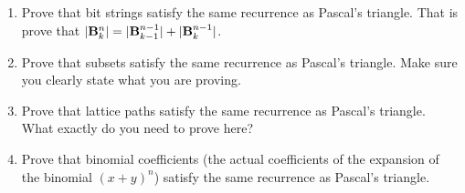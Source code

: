 \documentclass{book}
\begin{document}
\setcounter{project}{71}
\addtocounter{project}{-1}
\begin{activity}[]\label{activity-64}
\leavevmode%
\begin{enumerate}[font=\bfseries,label=(\alph*),ref=\alph*]
\item\label{task-101} \hypertarget{p-566}{}%
Prove that bit strings satisfy the same recurrence as Pascal's triangle.  That is prove that \(|\mathbf{B}^n_k| = |\mathbf{B}^{n-1}_{k-1}| + |\mathbf{B}^{n-1}_k|\).%
\item\label{task-102} \hypertarget{p-567}{}%
Prove that subsets satisfy the same recurrence as Pascal's triangle. Make sure you clearly state what you are proving.%
\item\label{task-103} \hypertarget{p-568}{}%
Prove that lattice paths satisfy the same recurrence as Pascal's triangle.  What exactly do you need to prove here?%
\item\label{task-104} \hypertarget{p-569}{}%
Prove that binomial coefficients (the actual coefficients of the expansion of the binomial \((x+y)^n\)) satisfy the same recurrence as Pascal's triangle.%
\end{enumerate}
\end{activity}
\end{document}

